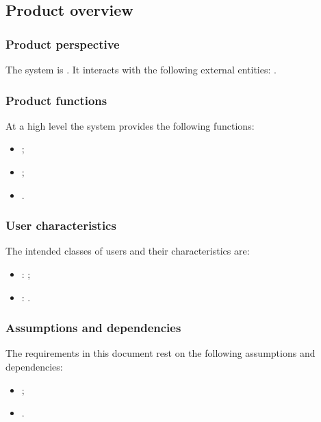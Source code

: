 \documentclass[12pt,a4paper]{extarticle}
\begin{document}
\subsection{Product overview}

\subsubsection{Product perspective}

The system is . It interacts with the following external entities: .

\subsubsection{Product functions}

At a high level the system provides the following functions:
\begin{itemize}[leftmargin=1.25cm]
    \item {};
    \item {};
    \item {}.
\end{itemize}

\subsubsection{User characteristics}

The intended classes of users and their characteristics are:
\begin{itemize}[leftmargin=1.25cm]
    \item \textbf{}: ;
    \item \textbf{}: .
\end{itemize}

\subsubsection{Assumptions and dependencies}

The requirements in this document rest on the following assumptions and dependencies:
\begin{itemize}[leftmargin=1.25cm]
    \item {};
    \item {}.
\end{itemize}
\end{document}
